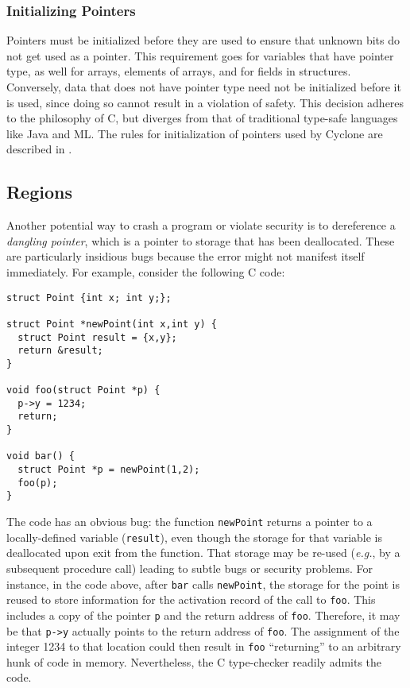 \subsubsection*{Initializing Pointers}

Pointers must be initialized before they are used to ensure that unknown
bits do not get used as a pointer.  This requirement goes for
variables that have pointer type, as well for arrays, elements of arrays,
and for fields in structures.  Conversely, data that does not have pointer
type need not be initialized before it is used, since doing so cannot result
in a violation of safety.  This decision adheres to the philosophy of C, but
diverges from that of traditional type-safe languages like Java and
ML.  The rules for initialization of pointers used by Cyclone are
described in .

\subsection{Regions}
\label{sec:tut-regions}

Another potential way to crash a program or violate security is
to dereference a \emph{dangling pointer}, which is a pointer to storage that
has been deallocated.  These are particularly insidious bugs
because the error might not manifest itself immediately.  
For example, consider the following C code:
\begin{verbatim}
struct Point {int x; int y;};

struct Point *newPoint(int x,int y) {
  struct Point result = {x,y};
  return &result;
}

void foo(struct Point *p) {
  p->y = 1234;
  return;
}

void bar() {
  struct Point *p = newPoint(1,2);
  foo(p);
}
\end{verbatim}
The code has an obvious bug: the function \texttt{newPoint} returns a
pointer to a locally-defined variable (\texttt{result}), even though
the storage for that variable is deallocated upon exit from the
function.  That storage may be re-used (\emph{e.g.}, by a subsequent procedure
call) leading to subtle bugs or security problems.  For instance, in
the code above, after \texttt{bar} calls \texttt{newPoint}, the storage
for the point is reused to store information for the activation
record of the call to \texttt{foo}.  This includes a copy of the
pointer \texttt{p} and the return address of \texttt{foo}.  Therefore,
it may be that \texttt{p->y} actually points to the return address of
\texttt{foo}. The assignment of the integer 1234 to that location could
then result in \texttt{foo} ``returning'' to an arbitrary hunk of code
in memory.  Nevertheless, the C type-checker readily
admits the code.

